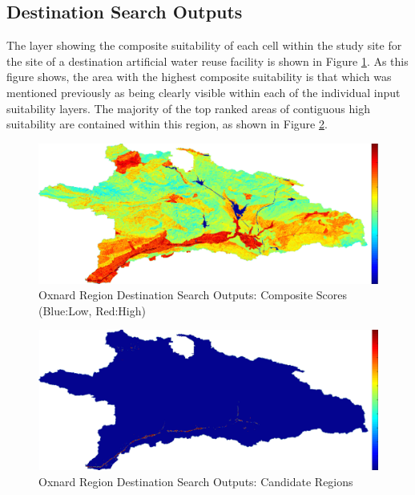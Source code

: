     \subsection{Destination Search Outputs}
    
The layer showing the composite suitability of each cell within the study site for the site of a destination artificial water reuse facility is shown in Figure \ref{fig:Odsoutputs_comp}. As this figure shows, the area with the highest composite suitability is that which was mentioned previously as being clearly visible within each of the individual input suitability layers. The majority of the top ranked areas of contiguous high suitability are contained within this region, as shown in Figure \ref{fig:Odsoutputs_cand}.
    
        \begin{figure}[!h]
            \begin{center}
            \includegraphics[width=5.5in]{figures/Oxnard_Search_Composite.png}   
            \caption{Oxnard Region Destination Search Outputs: Composite Scores (Blue:Low, Red:High)}
            \label{fig:Odsoutputs_comp}
            \end{center}
        \end{figure}
        
        \begin{figure}[!h]
            \begin{center}
            \includegraphics[width=5.5in]{figures/Oxnard_Search_Output.png}   
            \caption{Oxnard Region Destination Search Outputs: Candidate Regions}
            \label{fig:Odsoutputs_cand}
            \end{center}
        \end{figure}

